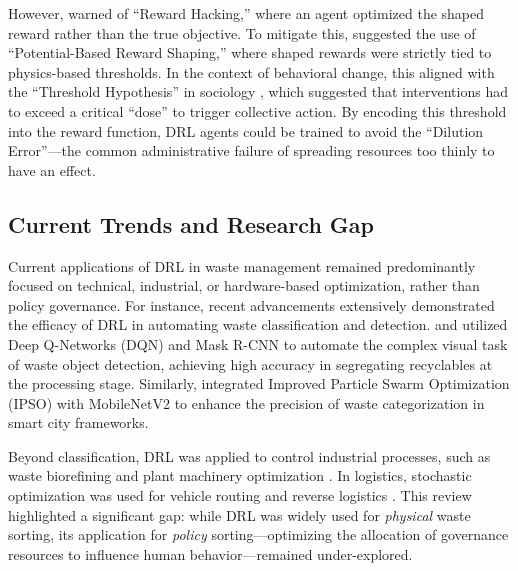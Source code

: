However, \cite{Amodei2016} warned of ``Reward Hacking,'' where an agent optimized the shaped reward rather than the true objective. To mitigate this, \cite{Popov2017} suggested the use of ``Potential-Based Reward Shaping,'' where shaped rewards were strictly tied to physics-based thresholds. In the context of behavioral change, this aligned with the ``Threshold Hypothesis'' in sociology \citep{Granovetter1978}, which suggested that interventions had to exceed a critical ``dose'' to trigger collective action. By encoding this threshold into the reward function, DRL agents could be trained to avoid the ``Dilution Error''—the common administrative failure of spreading resources too thinly to have an effect.

\subsection{Current Trends and Research Gap}
\label{subsec:research_gap}

Current applications of DRL in waste management remained predominantly focused on technical, industrial, or hardware-based optimization, rather than policy governance. For instance, recent advancements extensively demonstrated the efficacy of DRL in automating waste classification and detection. \cite{Duhayyim2022} and \cite{Khan2024} utilized Deep Q-Networks (DQN) and Mask R-CNN to automate the complex visual task of waste object detection, achieving high accuracy in segregating recyclables at the processing stage. Similarly, \cite{Udayakumar2023} integrated Improved Particle Swarm Optimization (IPSO) with MobileNetV2 to enhance the precision of waste categorization in smart city frameworks.

Beyond classification, DRL was applied to control industrial processes, such as waste biorefining \citep{Gao2024} and plant machinery optimization \citep{Kumar2022}. In logistics, stochastic optimization was used for vehicle routing \citep{Akbarpour2021, Khallaf2024} and reverse logistics \citep{Karagoz2022}. This review highlighted a significant gap: while DRL was widely used for \textit{physical} waste sorting, its application for \textit{policy} sorting—optimizing the allocation of governance resources to influence human behavior—remained under-explored.
